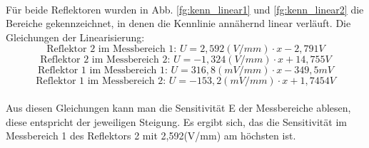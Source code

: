 ~\\
Für beide Reflektoren wurden in Abb. \ref{fg:kenn_linear1} und \ref{fg:kenn_linear2} die Bereiche gekennzeichnet, in denen die Kennlinie annähernd linear verläuft. Die Gleichungen der Linearisierung:
~\\
\begin{equation}
	\text{Reflektor 2 im Messbereich 1: }U = 2,592(V/mm) \cdot x - 2,791V
	\label{eq:refl2_mb1}
\end{equation}
\begin{equation}
	\text{Reflektor 2 im Messbereich 2: }U = -1,324(V/mm) \cdot x + 14,755V
	\label{eq:refl2_mb2}
\end{equation}
\begin{equation}
	\text{Reflektor 1 im Messbereich 1: }U = 316,8(mV/mm) \cdot x - 349,5mV
	\label{eq:refl1_mb1}
\end{equation}
\begin{equation}
	\text{Reflektor 1 im Messbereich 2: }U = -153,2(mV/mm) \cdot x + 1,7454V
	\label{eq:refl1_mb1}
\end{equation}
~\\
Aus diesen Gleichungen kann man die Sensitivität E der Messbereiche ablesen, diese entspricht der jeweiligen Steigung. Es ergibt sich, das die Sensitivität im Messbereich 1 des Reflektors 2 mit 2,592(V/mm) am höchsten ist.

